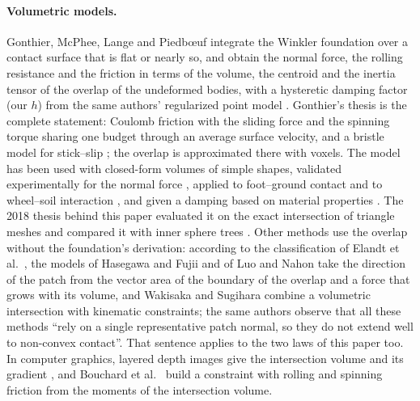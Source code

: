 \paragraph{Volumetric models.} Gonthier, McPhee, Lange and Piedb{\oe}uf \cite{Gonthier2005}
integrate the Winkler foundation over a contact surface that is flat or nearly so, and obtain
the normal force, the rolling resistance and the friction in terms of the volume, the centroid
and the inertia tensor of the overlap of the undeformed bodies, with a hysteretic damping factor
(our $h$) from the same authors' regularized point model \cite{Gonthier2004}. Gonthier's thesis
\cite{Gonthier2007thesis} is the complete statement: Coulomb friction with the sliding force and
the spinning torque sharing one budget through an average surface velocity, and a bristle model
for stick--slip \cite{Gonthier2007detc}; the overlap is approximated there with voxels. The
model has been used with closed-form volumes of simple shapes, validated experimentally for the
normal force \cite{Boos2013}, applied to foot--ground contact \cite{Shourijeh2015,Brown2018} and
to wheel--soil interaction \cite{Petersen2013}, and given a damping based on material
properties \cite{Roy2012}. The 2018 thesis behind this paper \cite{Vilela2018} evaluated it on
the exact intersection of triangle meshes and compared it with inner sphere trees
\cite{Weller2009}. Other methods use the overlap without the foundation's derivation: according
to the classification of Elandt et al.~\cite{Elandt2019}, the models of Hasegawa and Fujii
\cite{Hasegawa2003} and of Luo and Nahon \cite{Luo2006,Luo2011} take the direction of the patch
from the vector area of the boundary of the overlap and a force that grows with its volume, and
Wakisaka and Sugihara \cite{Wakisaka2017} combine a volumetric intersection with kinematic
constraints; the same authors observe that all these methods ``rely on a single representative
patch normal, so they do not extend well to non-convex contact''. That sentence applies to the
two laws of this paper too. In computer graphics, layered depth images give the intersection
volume and its gradient \cite{Faure2008,Allard2010}, and Bouchard et al.~\cite{Bouchard2015}
build a constraint with rolling and spinning friction from the moments of the intersection
volume.

